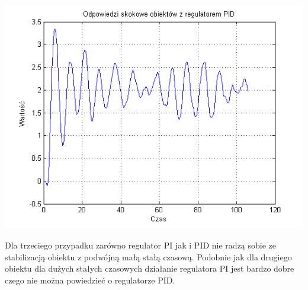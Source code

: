 \documentclass[10pt,a4paper]{article}
\begin{document}
\includegraphics[scale=1]{images/cztery/skrypt_06.png}\\
\newpage

Dla trzeciego przypadku zarówno regulator PI jak i PID nie radzą sobie ze stabilizacją obiektu z podwójną małą stałą czasową. Podobnie jak dla drugiego obiektu dla dużych stałych czasowych działanie regulatora PI jest bardzo dobre czego nie można powiedzieć o regulatorze PID. 
\newpage
\end{document}
